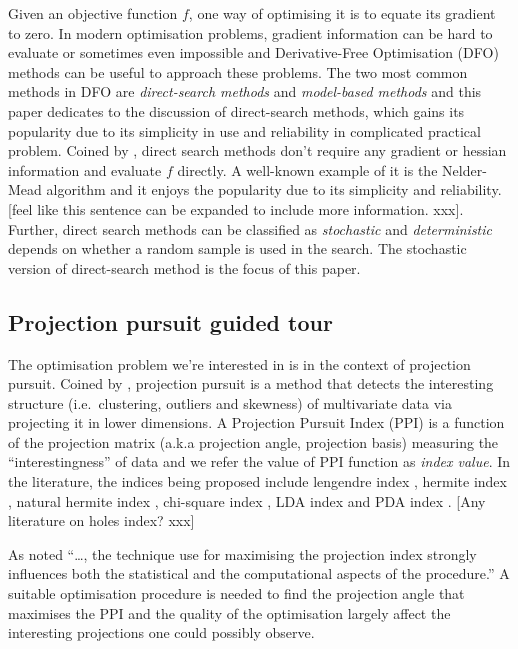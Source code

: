 \documentclass[12pt]{article}
\begin{document}
Given an objective function \(f\), one way of optimising it is to equate
its gradient to zero. In modern optimisation problems, gradient
information can be hard to evaluate or sometimes even impossible and
Derivative-Free Optimisation (DFO) methods can be useful to approach
these problems. The two most common methods in DFO are
\emph{direct-search methods} and \emph{model-based methods} and this
paper dedicates to the discussion of direct-search methods, which gains
its popularity due to its simplicity in use and reliability in
complicated practical problem. Coined by \citet{hooke1961direct}, direct
search methods don't require any gradient or hessian information and
evaluate \(f\) directly. A well-known example of it is the Nelder-Mead
algorithm \citep{nelder1965simplex} and it enjoys the popularity due to
its simplicity and reliability. {[}feel like this sentence can be
expanded to include more information. xxx{]}. Further, direct search
methods can be classified as \emph{stochastic} and \emph{deterministic}
depends on whether a random sample is used in the search. The stochastic
version of direct-search method is the focus of this paper.

\hypertarget{projection-pursuit-guided-tour}{%
\subsection{Projection pursuit guided
tour}\label{projection-pursuit-guided-tour}}

The optimisation problem we're interested in is in the context of
projection pursuit. Coined by \citet{friedman1974projection}, projection
pursuit is a method that detects the interesting structure
(i.e.~clustering, outliers and skewness) of multivariate data via
projecting it in lower dimensions. A Projection Pursuit Index (PPI) is a
function of the projection matrix (a.k.a projection angle, projection
basis) measuring the ``interestingness'' of data and we refer the value
of PPI function as \emph{index value}. In the literature, the indices
being proposed include lengendre index \citep{friedman1974projection},
hermite index \citep{hall1989polynomial}, natural hermite index
\citep{cook1993projection}, chi-square index
\citep{posse1995projection}, LDA index \citep{lee2005projection} and PDA
index \citep{lee2010projection}. {[}Any literature on holes index?
xxx{]}

As \citet{friedman1974projection} noted ``\ldots{}, the technique use
for maximising the projection index strongly influences both the
statistical and the computational aspects of the procedure.'' A suitable
optimisation procedure is needed to find the projection angle that
maximises the PPI and the quality of the optimisation largely affect the
interesting projections one could possibly observe.
\end{document}
